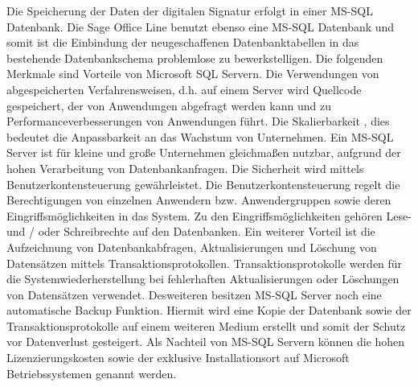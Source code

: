Die Speicherung der Daten der digitalen Signatur erfolgt in einer MS-SQL Datenbank. Die Sage Office Line benutzt ebenso eine MS-SQL Datenbank und somit ist die Einbindung der neugeschaffenen Datenbanktabellen in das bestehende Datenbankschema problemlose zu bewerkstelligen. Die folgenden  Merkmale sind Vorteile von Microsoft SQL Servern. Die Verwendungen von abgespeicherten Verfahrensweisen, d.h. auf einem Server wird Quellcode  gespeichert, der von Anwendungen abgefragt werden kann und zu Performanceverbesserungen von Anwendungen führt. Die Skalierbarkeit , dies bedeutet die Anpassbarkeit an das Wachstum von Unternehmen. Ein MS-SQL Server ist für kleine und große Unternehmen gleichmaßen nutzbar, aufgrund der hohen Verarbeitung von Datenbankanfragen. Die Sicherheit wird mittels Benutzerkontensteuerung gewährleistet. Die Benutzerkontensteuerung regelt die Berechtigungen von einzelnen Anwendern bzw. Anwendergruppen sowie deren Eingriffsmöglichkeiten in das System. Zu den Eingriffsmöglichkeiten gehören Lese- und / oder Schreibrechte auf den Datenbanken. Ein weiterer Vorteil ist die Aufzeichnung von Datenbankabfragen, Aktualisierungen und Löschung von Datensätzen mittels Transaktionsprotokollen. Transaktionsprotokolle werden für die Systemwiederherstellung bei fehlerhaften Aktualisierungen oder Löschungen von Datensätzen verwendet. Desweiteren besitzen MS-SQL Server noch eine automatische Backup Funktion. Hiermit wird eine Kopie der Datenbank sowie der Transaktionsprotokolle auf einem weiteren Medium erstellt und somit der Schutz vor Datenverlust gesteigert. Als Nachteil von MS-SQL Servern können die hohen Lizenzierungskosten sowie der exklusive Installationsort auf Microsoft Betriebssystemen genannt werden. \cite{SQLv1}